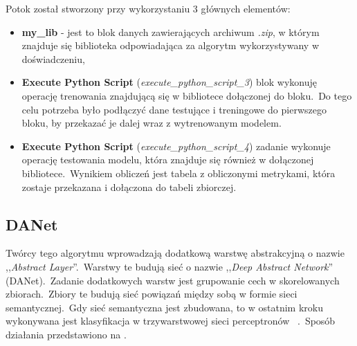 Potok został stworzony przy wykorzystaniu 3 głównych elementów:
\begin{itemize}
    \item \textbf{my\_lib} - jest to blok danych zawierających archiwum \textit{.zip}, w którym znajduje się biblioteka odpowiadająca za algorytm wykorzystywany w doświadczeniu,
    \item \textbf{Execute Python Script} (\textit{execute\_python\_script\_3}) blok wykonuję operację trenowania znajdującą się w bibliotece dołączonej do bloku.\ Do tego celu potrzeba było podłączyć dane testujące i treningowe do pierwszego bloku, by przekazać je dalej wraz z wytrenowanym modelem.
    \item \textbf{Execute Python Script} (\textit{execute\_python\_script\_4}) zadanie wykonuje operację testowania modelu, która znajduje się również w dołączonej bibliotece.\ Wynikiem obliczeń jest tabela z obliczonymi metrykami, która zostaje przekazana i dołączona do tabeli zbiorczej.
\end{itemize}

\subsection{DANet}
Twórcy tego algorytmu wprowadzają dodatkową warstwę abstrakcyjną o nazwie ,,\textit{Abstract Layer}''.\ Warstwy te budują sieć o nazwie ,,\textit{Deep Abstract Network}'' (DANet).\ Zadanie dodatkowych warstw jest grupowanie cech w skorelowanych zbiorach.\ Zbiory te budują sieć powiązań między sobą w formie sieci semantycznej.\ Gdy sieć semantyczna jest zbudowana, to w ostatnim kroku wykonywana jest klasyfikacja w trzywarstwowej sieci perceptronów ~\cite{Chen2022, Danet}.\ Sposób działania przedstawiono na .


